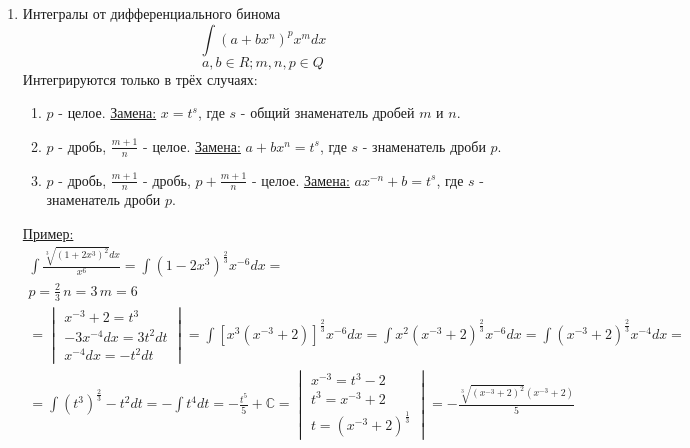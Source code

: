 \documentclass[12pt]{article}
\begin{document}
\begin{enumerate}
        \item Интегралы от дифференциального бинома
        \[ \int (a + bx^n)^p x^m dx \]
        \[ a,b \in R; m,n,p \in Q \]
        Интегрируются только в трёх случаях:
        \begin{enumerate}
            \item $p$ - целое. \underline{Замена:} $x = t^s$, где $s$ - общий знаменатель дробей $m$ и $n$.
            \item $p$ - дробь, $\frac{m+1}{n}$ - целое. \underline{Замена:} $a + bx^n = t^s$, где $s$ - знаменатель дроби $p$.
            \item $p$ - дробь, $\frac{m+1}{n}$ - дробь, $p + \frac{m+1}{n}$ - целое. \underline{Замена:} $ax^{-n} + b = t^s$, где $s$ - знаменатель дроби $p$.
        \end{enumerate}
        \underline{Пример:}
        \begin{gather*}
            \int \frac{\sqrt[3]{(1+2x^3)^2}dx}{x^6} = \int (1 - 2x^3)^{\frac{2}{3}}x^{-6}dx \boxed{=}\\
            p = \frac{2}{3}\, n = 3\, m = 6\\
            \boxed{=} \begin{vmatrix}
                x^{-3} + 2 = t^3\\
                -3x^{-4}dx = 3t^2dt\\
                x^{-4}dx = -t^2dt
            \end{vmatrix} = \int [x^3(x^{-3}+2)]^{\frac{2}{3}}x^{-6}dx = \int x^2(x^{-3}+2)^\frac{2}{3}x^{-6}dx = \int (x^{-3} + 2)^{\frac{2}{3}}x^{-4}dx =\\
            = \int (t^3)^\frac{2}{3} - t^2dt = -\int t^4dt = -\frac{t^5}{5} + \mathbb{C} = \begin{vmatrix}
                x^{-3} = t^3-2\\
                t^3 = x^{-3} + 2\\
                t = (x^{-3}+2)^{\frac{1}{3}}
            \end{vmatrix} = -\frac{\sqrt[3]{(x^{-3}+2)^2}(x^{-3}+2)}{5}
        \end{gather*}


\end{enumerate}
\end{document}
